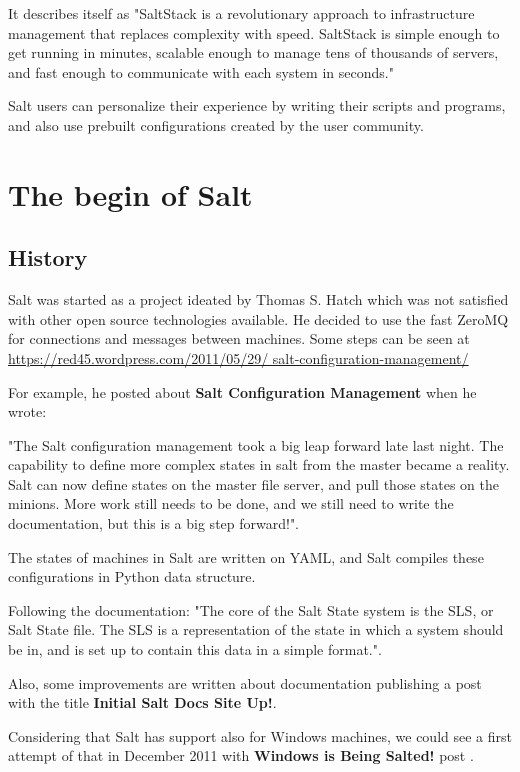 \documentclass[12pt,a4paper,openright,twoside]{book}
\begin{document}
It describes itself as "SaltStack is a revolutionary approach to infrastructure management that replaces complexity with speed. SaltStack is simple enough to get running in minutes, scalable enough to manage tens of thousands of servers, and fast enough to communicate with each system in seconds."\cite{saltDocStart}


Salt users can personalize their experience by writing their scripts and programs, and also use prebuilt configurations created by the user community.

\section{The begin of Salt}

\subsection{History}
Salt was started as a project ideated by Thomas S. Hatch which was not satisfied with other open source technologies available\cite{saltFloss}. He decided to use the fast ZeroMQ for connections and messages between machines. Some steps can be seen at \url{https://red45.wordpress.com/2011/05/29/
salt-configuration-management/}


For example, he posted about \textbf{Salt Configuration Management} when he wrote:


"The Salt configuration management took a big leap forward late last night. The capability to define more complex states in salt from the master became a reality. Salt can now define states on the master file server, and pull those states on the minions. More work still needs to be done, and we still need to write the documentation, but this is a big step forward!".


The states of machines in Salt are written on YAML, and Salt compiles these configurations in Python data structure.


Following the documentation: "The core of the Salt State system is the SLS, or Salt State file. The SLS is a representation of the state in which a system should be in, and is set up to contain this data in a simple format."\cite{saltDocSLS}.

Also, some improvements are written about documentation publishing a post with the title \textbf{Initial Salt Docs Site Up!}\cite{saltPost}.


Considering that Salt has support also for Windows machines, we could see a first attempt of that in December 2011 with \textbf{Windows is Being Salted!} post \cite{saltPost2}.
\end{document}
